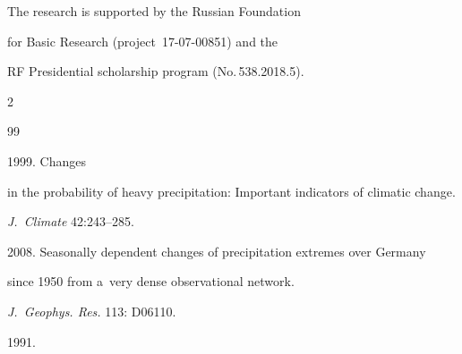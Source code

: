 \Ack


\noindent


The research is supported by the Russian Foundation 


for Basic Research (project~17-07-00851) and the 


RF Presidential scholarship program (No.\,538.2018.5).













  \begin{multicols}{2}





\renewcommand{\bibname}{\protect\rmfamily References}







{\small\frenchspacing


 {%




 \begin{thebibliography}{99}




 1999. Changes


in the probability of heavy precipitation: Important indicators of climatic change. 


\textit{J.~Climate} 42:243--285.









2008. Seasonally dependent changes of precipitation extremes over Germany 


since 1950 from a~very dense observational network. 


\textit{J.~Geophys. Res.} 113: D06110.







 1991. 



\end{thebibliography}}}
\end{multicols}
